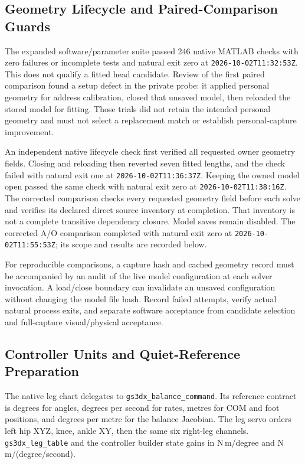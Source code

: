 \documentclass[11pt,a4paper]{article}
\begin{document}
\subsection{Geometry Lifecycle and Paired-Comparison Guards}
The expanded software/parameter suite passed 246 native MATLAB checks with
zero failures or incomplete tests and natural exit zero at
\texttt{2026-10-02T11:32:53Z}. This does not qualify a fitted head candidate.
Review of the first paired comparison found a setup defect in the private
probe: it applied personal geometry for address calibration, closed that
unsaved model, then reloaded the stored model for fitting. Those trials did
not retain the intended personal geometry and must not select a replacement
match or establish personal-capture improvement.

An independent native lifecycle check first verified all requested owner
geometry fields. Closing and reloading then reverted seven fitted lengths,
and the check failed with natural exit one at
\texttt{2026-10-02T11:36:37Z}. Keeping the owned model open passed the same
check with natural exit zero at \texttt{2026-10-02T11:38:16Z}. The corrected
comparison checks every requested geometry field before each solve and
verifies its declared direct source inventory at completion. That inventory
is not a complete transitive dependency closure. Model saves remain disabled.
The corrected A/O comparison completed with natural exit zero at
\texttt{2026-10-02T11:55:53Z}; its scope and results are recorded below.

For reproducible comparisons, a capture hash and cached geometry record
must be accompanied by an audit of the live model configuration at each
solver invocation. A load/close boundary can invalidate an unsaved
configuration without changing the model file hash. Record failed attempts,
verify actual natural process exits, and separate software acceptance from
candidate selection and full-capture visual/physical acceptance.

\subsection{Controller Units and Quiet-Reference Preparation}
The native leg chart delegates to \texttt{gs3dx\_balance\_command}. Its
reference contract is degrees for angles, degrees per second for rates,
metres for COM and foot positions, and degrees per metre for the balance
Jacobian. The leg servo orders left hip XYZ, knee, ankle XY, then the same
six right-leg channels. \texttt{gs3dx\_leg\_table} and the controller builder
state gains in N\,m/degree and N\,m/(degree/second).
\end{document}
